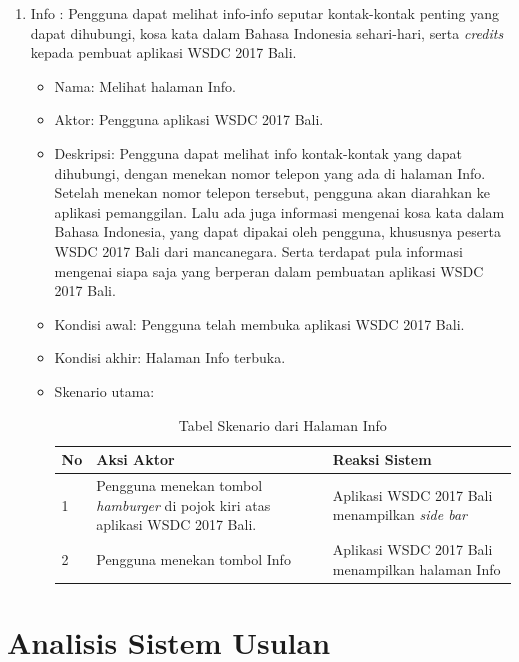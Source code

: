 \begin{enumerate}
\begin{itemize}
\begin{table}[H]
			\label{table:skenarioHalamanHasil}
		\end{table}
	\end{itemize}
\newpage
	\item Info : Pengguna dapat melihat info-info seputar kontak-kontak penting yang dapat dihubungi, kosa kata dalam Bahasa Indonesia sehari-hari, serta {\it credits} kepada pembuat aplikasi WSDC 2017 Bali.
	\begin{itemize}
		\item Nama: Melihat halaman Info.
		\item Aktor: Pengguna aplikasi WSDC 2017 Bali.
		\item Deskripsi: Pengguna dapat melihat info kontak-kontak yang dapat dihubungi, dengan menekan nomor telepon yang ada di halaman Info. Setelah menekan nomor telepon tersebut, pengguna akan diarahkan ke aplikasi pemanggilan. Lalu ada juga informasi mengenai kosa kata dalam Bahasa Indonesia, yang dapat dipakai oleh pengguna, khususnya peserta WSDC 2017 Bali dari mancanegara. Serta terdapat pula informasi mengenai siapa saja yang berperan dalam pembuatan aplikasi WSDC 2017 Bali.
		\item Kondisi awal: Pengguna telah membuka aplikasi WSDC 2017 Bali.
		\item Kondisi akhir: Halaman Info terbuka.
		\item Skenario utama: \\
		\begin{table}[H]
			\centering
			\begin{tabular}{|p{0.5cm}|p{7cm}|p{7cm}|}
				\hline
				No & Aksi Aktor                               & Reaksi Sistem                                          \\ \hline
				1  & Pengguna menekan tombol {\it hamburger} di pojok kiri atas aplikasi WSDC 2017 Bali. & Aplikasi WSDC 2017 Bali menampilkan {\it side bar} \\ \hline
				2  & Pengguna menekan tombol Info & Aplikasi WSDC 2017 Bali menampilkan halaman Info \\ \hline
			\end{tabular}
			\caption{Tabel Skenario dari Halaman Info}
			\label{table:skenarioHalamanInfo}
		\end{table}
	\end{itemize}
\end{enumerate}

\section{Analisis Sistem Usulan}
\label{sec:analisisSistemUsulan}

